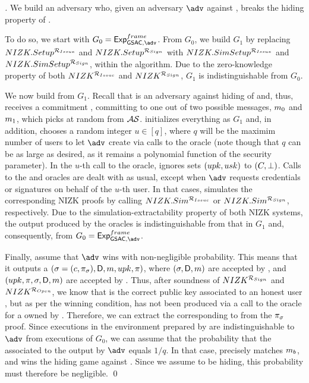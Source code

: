\begin{proof}[]
  We build an adversary \advB who, given an adversary $\adv$ against
  \ExpGSACNonframe, breaks the hiding property of \C.

  To do so, we start with $G_0=\ExpGSACNonframe$. From $G_0$, we build $G_1$
  by replacing $NIZK.Setup^{\mathcal{R}_{Issue}}$ and  $NIZK.Setup^{\mathcal{R}_{Sign}}$
  with $NIZK.SimSetup^{\mathcal{R}_{Issue}}$ and $NIZK.SimSetup^{\mathcal{R}_{Sign}}$,
  within the \Setup algorithm. Due to the zero-knowledge property of both
  $NIZK^{\mathcal{R}_{Issue}}$ and $NIZK^{\mathcal{R}_{Sign}}$, $G_1$ is
  indistinguishable from $G_0$.

  We now build \advB from $G_1$. Recall that \advB is an adversary against
  hiding of \C and, thus, receives a commitment \Ccom, committing to one out
  of two possible messages, $m_0$ and $m_1$, which \advB picks at random
  from $\mathcal{AS}$. \advB initializes everything as $G_1$ and, in addition,
  chooses a random integer $u \in [q]$, where $q$ will be the maximim number of
  users to let $\adv$ create via calls to the \HUGEN oracle (note though that
  $q$ can be as large as desired, as it remains a polynomial function of the
  security parameter). In the $u$-th call to the \HUGEN oracle, \advB ignores
  sets $(upk,usk)$ to $(C,\bot)$. Calls to the \OBTAIN and \SIGN oracles
  are dealt with as usual, except when $\adv$ requests credentials or signatures
  on behalf of the $u$-th user. In that cases, \advB simulates the corresponding
  NIZK proofs by calling $NIZK.Sim^{\mathcal{R}_{Issue}}$ or
  $NIZK.Sim^{\mathcal{R}_{Sign}}$, respectively. Due to the
  simulation-extractability property of both NIZK systems, the output produced
  by the oracles is indistinguishable from that in $G_1$ and, consequently, from
  $G_0=\ExpGSACNonframe$.

  Finally, assume that $\adv$ wins \ExpGSACNonframe with non-negligible
  probability. This means that it outputs a $(\sigma = (c,\pi_\sigma),\mathsf{D},
  m,upk,\pi)$, where $(\sigma,\mathsf{D},m)$ are accepted by \Verify, and
  $(upk,\pi,\sigma,\mathsf{D},m)$ are accepted by \Judge. Thus, after soundness
  of $NIZK^{\mathcal{R}_{Sign}}$ and $NIZK^{\mathcal{R}_{Open}}$, we know that
  \upk is the correct public key associated to an honest user \uid, but as per
  the winning condition, \sig has not been produced via a call to the \SIGN
  oracle for a \cid owned by \uid. Therefore, we can extract the \usk
  corresponding to \upk from the $\pi_{\sigma}$ proof. Since executions in the
  environment prepared by \advB are indistinguishable to $\adv$ from executions
  of $G_0$, we can assume that the probability that the \uid associated to the
  \sig output by $\adv$ equals $1/q$. In that case, \usk precisely matches
  $m_b$, and \advB wins the hiding game against \C. Since we assume \C
  to be hiding, this probability must therefore be negligible.   
  \qed
\end{proof}

